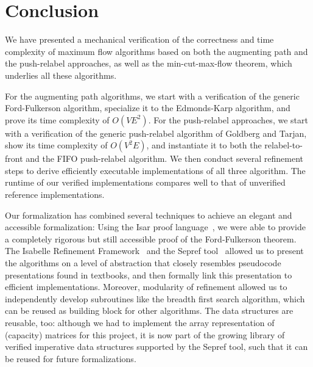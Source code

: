 \documentclass[smallcondensed]{svjour3}     %
\begin{document}
% 
% 
    
    

\section{Conclusion}\label{sec:concl}
  We have presented a mechanical verification of the correctness and time complexity of maximum flow algorithms based on both 
  the augmenting path and the push-relabel approaches, as well as the min-cut-max-flow theorem, which underlies all these algorithms.
  
  For the augmenting path algorithms, we start with a verification of the generic Ford-Fulkerson algorithm, 
  specialize it to the Edmonds-Karp algorithm, and prove its time complexity of $O(VE^2)$.
  For the push-relabel approaches, we start with a verification of the generic push-relabel algorithm of Goldberg and Tarjan, show its time complexity of $O(V^2E)$, and
  instantiate it to both the relabel-to-front and the FIFO push-relabel algorithm.
  We then conduct several refinement steps to derive efficiently executable implementations of all three algorithm.
  The runtime of our verified implementations compares well to that of unverified reference implementations.
  
  Our formalization has combined several techniques to achieve an elegant and accessible formalization: 
  Using the Isar proof language~\cite{Wenzel99}, we were able to provide a completely rigorous but 
  still accessible proof of the Ford-Fulkerson theorem. The Isabelle Refinement Framework~\cite{LaTu12,La12} and the Sepref tool~\cite{La15,La16}
  allowed us to present the algorithms on a level 
  of abstraction that closely resembles pseudocode presentations found in textbooks, and then formally link this presentation to efficient
  implementations. Moreover, modularity of refinement allowed us to independently develop subroutines like the breadth first search algorithm, 
  which can be reused as building block for other algorithms.
  The data structures are reusable, too: although we had to implement the array representation of (capacity) matrices for this project, it is now part of the 
  growing library of verified imperative data structures supported by the Sepref tool, such that it can be reused for future formalizations.
  
\end{document}
